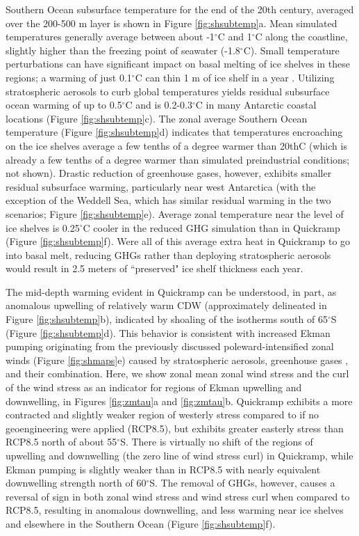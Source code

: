\documentclass[grl]{AGUTeX}  %
\begin{document}
\begin{article}
Southern Ocean subsurface temperature for the end of the 20th century, averaged over the 200-500 m layer is shown in Figure \ref{fig:shsubtemp}a. Mean simulated temperatures generally average between about -1$^\circ$C and 1$^\circ$C along the coastline, slightly higher than the freezing point of seawater (-1.8$^\circ$C). Small temperature perturbations can have significant impact on basal melting of ice shelves in these regions; a warming of just 0.1$^\circ$C can thin 1 m of ice shelf in a year \citep{rignot02}. Utilizing stratospheric aerosols to curb global temperatures yields residual subsurface ocean warming of up to 0.5$^\circ$C and is 0.2-0.3$^\circ$C in many Antarctic coastal locations (Figure \ref{fig:shsubtemp}c). The zonal average Southern Ocean temperature (Figure \ref{fig:shsubtemp}d) indicates that temperatures encroaching on the ice shelves average a few tenths of a degree warmer than 20thC (which is already a few tenths of a degree warmer than simulated preindustrial conditions; not shown). Drastic reduction of greenhouse gases, however, exhibits smaller residual subsurface warming, particularly near west Antarctica (with the exception of the Weddell Sea, which has similar residual warming in the two scenarios; Figure \ref{fig:shsubtemp}e). Average zonal temperature near the level of ice shelves is 0.25$^\circ$C cooler in the reduced GHG simulation than in Quickramp (Figure \ref{fig:shsubtemp}f). Were all of this average extra heat in Quickramp to go into basal melt, reducing GHGs rather than deploying stratospheric aerosols would result in 2.5 meters of ``preserved" ice shelf thickness each year. 

The mid-depth warming evident in Quickramp can be understood, in part, as anomalous upwelling of relatively warm CDW (approximately delineated in Figure \ref{fig:shsubtemp}b), indicated by shoaling of the isotherms south of 65$^\circ$S (Figure \ref{fig:shsubtemp}d). This behavior is consistent with increased Ekman pumping originating from the previously discussed poleward-intensified zonal winds (Figure \ref{fig:shmaps}e) caused by stratospheric aerosols, greenhouse gases \citep{fyfe07}, and their combination. Here, we show zonal mean zonal wind stress and the curl of the wind stress as an indicator for regions of Ekman upwelling and downwelling, in Figures \ref{fig:zmtau}a and \ref{fig:zmtau}b. Quickramp exhibits a more contracted and slightly weaker region of westerly stress compared to if no geoengineering were applied (RCP8.5), but exhibits greater easterly stress than RCP8.5 north of about 55$^\circ$S. There is virtually no shift of the regions of upwelling and downwelling (the zero line of wind stress curl) in Quickramp, while Ekman pumping is slightly weaker than in RCP8.5 with nearly equivalent downwelling strength north of 60$^\circ$S. The removal of GHGs, however, causes a reversal of sign in both zonal wind stress and wind stress curl when compared to RCP8.5, resulting in anomalous downwelling, and less warming near ice shelves and elsewhere in the Southern Ocean (Figure \ref{fig:shsubtemp}f).  


\end{article}
\end{document}
